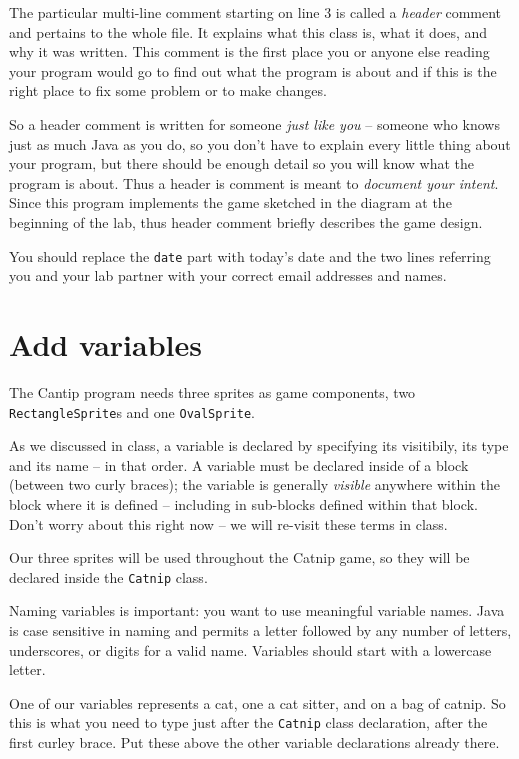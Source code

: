 \documentclass[12pt]{article}
\newcommand{\fname}[1]{\texttt{#1}}
\newcommand{\code}[1]{\texttt{#1}}
\begin{document}
The particular multi-line comment starting on line 3 is called
a \emph{header} comment and pertains to the
whole file.
It explains what this class is, what it does, and why it
was written.
This comment is the first place you
or anyone else reading your program would go
to find out what the program is about
and if this is the right place to fix some
problem or to make changes.

So a header comment is written for
someone \emph{just like you} --
someone who knows just as much Java as you do,
so you don't have to explain every little thing about your program,
but there should be enough detail so you will know
what the program is about.
Thus a header is comment is meant to \emph{document your intent}.
Since this program implements the game sketched in the diagram
at the beginning of the lab,
thus header comment briefly describes the game design.

You should replace the \fname{date} part with today's date
and the two lines referring you and your lab partner
with your correct email addresses and names.

\section*{Add variables}

The Cantip program needs three sprites as game components,
two \code{RectangleSprite}s and one \code{OvalSprite}.

As we discussed in class,
a variable is declared by specifying its visitibily, its type and its name --
in that order.
A variable must be declared inside of a block (between two curly braces);
the variable is generally \emph{visible} anywhere
within the block where it is defined --
including in sub-blocks defined within that block.
Don't worry about this right now -- we will re-visit these terms in class.

Our three sprites will be used throughout the Catnip game,
so they will be declared inside the \verb.Catnip. class.

Naming variables is important: you
want to use meaningful variable names. Java is case sensitive in
naming and permits a letter followed by
any number of letters, underscores, or digits for a valid name.
Variables should start with a lowercase letter.

One of our variables represents a cat, one
a cat sitter, and on a bag of catnip.
So this is what you need to type
just after the \verb.Catnip. class declaration,
after the first curley brace.
Put these above the other variable declarations already there.
\end{document}
